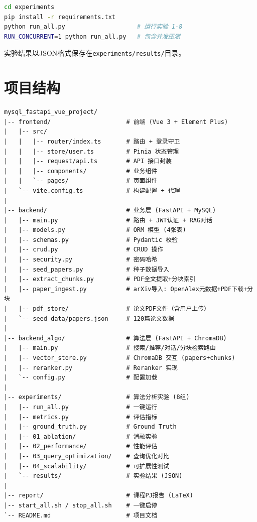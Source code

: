 \documentclass[12pt,a4paper]{ctexart}
\newcommand{\code}[1]{\texttt{#1}}
\begin{document}
\begin{lstlisting}[language=bash]
cd experiments
pip install -r requirements.txt
python run_all.py                    # 运行实验 1-8
RUN_CONCURRENT=1 python run_all.py   # 包含并发压测
\end{lstlisting}

实验结果以JSON格式保存在\code{experiments/results/}目录。


\section{项目结构}

\begin{lstlisting}[basicstyle=\small\ttfamily, frame=none, numbers=none, xleftmargin=0em]
mysql_fastapi_vue_project/
|-- frontend/                     # 前端 (Vue 3 + Element Plus)
|   |-- src/
|   |   |-- router/index.ts       # 路由 + 登录守卫
|   |   |-- store/user.ts         # Pinia 状态管理
|   |   |-- request/api.ts        # API 接口封装
|   |   |-- components/           # 业务组件
|   |   `-- pages/                # 页面组件
|   `-- vite.config.ts            # 构建配置 + 代理
|
|-- backend/                      # 业务层 (FastAPI + MySQL)
|   |-- main.py                   # 路由 + JWT认证 + RAG对话
|   |-- models.py                 # ORM 模型 (4张表)
|   |-- schemas.py                # Pydantic 校验
|   |-- crud.py                   # CRUD 操作
|   |-- security.py               # 密码哈希
|   |-- seed_papers.py            # 种子数据导入
|   |-- extract_chunks.py         # PDF全文提取+分块索引
|   |-- paper_ingest.py           # arXiv导入: OpenAlex元数据+PDF下载+分块
|   |-- pdf_store/                # 论文PDF文件（含用户上传）
|   `-- seed_data/papers.json     # 120篇论文数据
|
|-- backend_algo/                 # 算法层 (FastAPI + ChromaDB)
|   |-- main.py                   # 搜索/推荐/对话/分块检索路由
|   |-- vector_store.py           # ChromaDB 交互 (papers+chunks)
|   |-- reranker.py               # Reranker 实现
|   `-- config.py                 # 配置加载
|
|-- experiments/                  # 算法分析实验 (8组)
|   |-- run_all.py                # 一键运行
|   |-- metrics.py                # 评估指标
|   |-- ground_truth.py           # Ground Truth
|   |-- 01_ablation/              # 消融实验
|   |-- 02_performance/           # 性能评估
|   |-- 03_query_optimization/    # 查询优化对比
|   |-- 04_scalability/           # 可扩展性测试
|   `-- results/                  # 实验结果 (JSON)
|
|-- report/                       # 课程PJ报告 (LaTeX)
|-- start_all.sh / stop_all.sh    # 一键启停
`-- README.md                     # 项目文档
\end{lstlisting}
\end{document}
